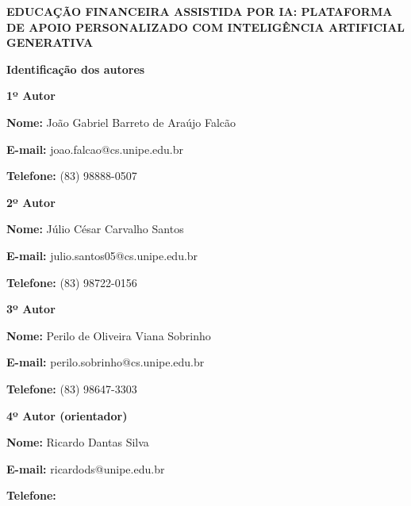 \begin{titlepage}
\begin{center}
    \textbf{\MakeUppercase{Educação Financeira Assistida por IA: Plataforma de Apoio Personalizado com Inteligência Artificial Generativa}}
\end{center}
\vspace{1.5cm}

\noindent\textbf{Identificação dos autores}

\vspace{0.5cm}

\noindent\textbf{1º Autor}

\noindent\textbf{Nome:} João Gabriel Barreto de Araújo Falcão

\noindent\textbf{E-mail:} joao.falcao@cs.unipe.edu.br

\noindent\textbf{Telefone:} (83) 98888-0507

\vspace{0.5cm}

\noindent\textbf{2º Autor}

\noindent\textbf{Nome:} Júlio César Carvalho Santos

\noindent\textbf{E-mail:} julio.santos05@cs.unipe.edu.br

\noindent\textbf{Telefone:} (83) 98722-0156

\vspace{0.5cm}

\noindent\textbf{3º Autor}

\noindent\textbf{Nome:} Perilo de Oliveira Viana Sobrinho

\noindent\textbf{E-mail:} perilo.sobrinho@cs.unipe.edu.br

\noindent\textbf{Telefone:} (83) 98647-3303

\vspace{0.5cm}

\noindent\textbf{4º Autor (orientador)}

\noindent\textbf{Nome:} Ricardo Dantas Silva

\noindent\textbf{E-mail:} ricardods@unipe.edu.br

\noindent\textbf{Telefone:} 

\end{titlepage}